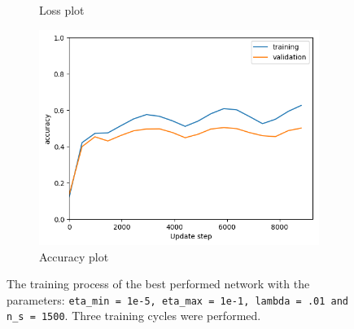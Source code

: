 \documentclass[12pt]{article}
\newenvironment{question}[2][Question]{\begin{trivlist}
\kern10pt
\item[\hskip \labelsep {\bfseries #1}\hskip \labelsep {\bfseries #2.}]}{\end{trivlist}}
\begin{document}
\begin{question}{v}
\begin{figure}[!htb]
\begin{subfigure}[b]{0.32\textwidth}
        \caption{Loss plot}
    \end{subfigure}\hfill
    \begin{subfigure}[b]{0.32\textwidth}%
        \includegraphics[width=\linewidth]{f5_acc_plt.png}
        \caption{Accuracy plot}
    \end{subfigure}
    \caption{
        The training process of the best performed network with the parameters:
        \texttt{eta\_min = 1e-5, eta\_max = 1e-1,  lambda = .01 and n\_s = 1500}.
        Three training cycles were performed.
    }
    \label{fig:best_lambda}
\end{figure}
\end{question}
\end{document}
